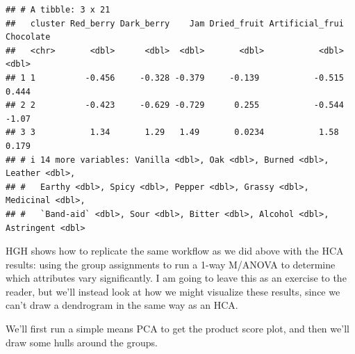 \documentclass[
]{book}
\begin{document}
\begin{verbatim}
## # A tibble: 3 x 21
##   cluster Red_berry Dark_berry    Jam Dried_fruit Artificial_frui Chocolate
##   <chr>       <dbl>      <dbl>  <dbl>       <dbl>           <dbl>     <dbl>
## 1 1          -0.456     -0.328 -0.379     -0.139           -0.515     0.444
## 2 2          -0.423     -0.629 -0.729      0.255           -0.544    -1.07 
## 3 3           1.34       1.29   1.49       0.0234           1.58      0.179
## # i 14 more variables: Vanilla <dbl>, Oak <dbl>, Burned <dbl>, Leather <dbl>,
## #   Earthy <dbl>, Spicy <dbl>, Pepper <dbl>, Grassy <dbl>, Medicinal <dbl>,
## #   `Band-aid` <dbl>, Sour <dbl>, Bitter <dbl>, Alcohol <dbl>, Astringent <dbl>
\end{verbatim}

HGH shows how to replicate the same workflow as we did above with the HCA results: using the group assignments to run a 1-way M/ANOVA to determine which attributes vary significantly. I am going to leave this as an exercise to the reader, but we'll instead look at how we might visualize these results, since we can't draw a dendrogram in the same way as an HCA.

We'll first run a simple means PCA to get the product score plot, and then we'll draw some hulls around the groups.
\end{document}

